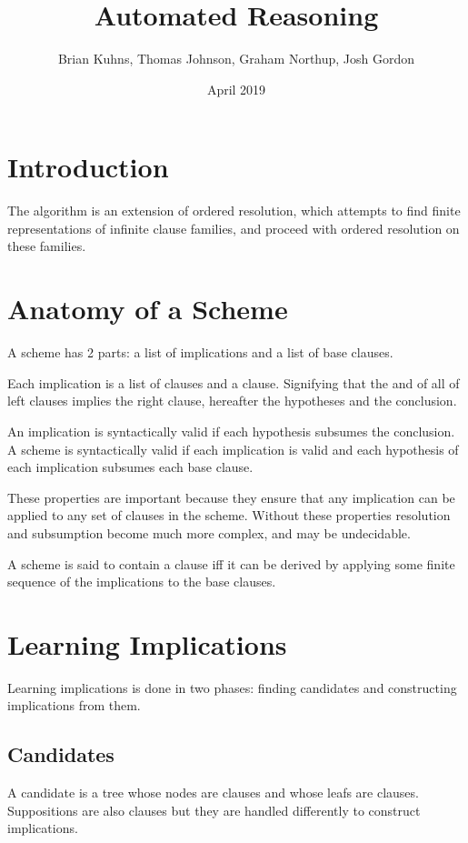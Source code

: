 \documentclass{article}
\title{Automated Reasoning}
\author{
    Brian Kuhns,
    Thomas Johnson,
    Graham Northup,
    Josh Gordon
  } %
\date{April 2019}
\begin{document}
\maketitle

\section{Introduction}

The algorithm is an extension of ordered resolution,
which attempts to find finite representations of infinite clause families,
and proceed with ordered resolution on these families.

\section{Anatomy of a Scheme}

A scheme has 2 parts:
a list of implications and a list of base clauses.

Each implication is a list of clauses and a clause.
Signifying that the and of all of left clauses implies the right clause,
hereafter the hypotheses and the conclusion.

An implication is syntactically valid if each hypothesis subsumes the conclusion.
A scheme is syntactically valid if each implication is valid and
each hypothesis of each implication subsumes each base clause.

These properties are important because they ensure that any implication can be applied to any set of clauses in the scheme.
Without these properties resolution and subsumption become much more complex, and may be undecidable.

A scheme is said to contain a clause iff it can be derived by applying some finite sequence of the 
implications to the base clauses.

\section{Learning Implications}

Learning implications is done in two phases: finding candidates and constructing implications from them.
 
\subsection{Candidates}

A candidate is a tree whose nodes are clauses and whose leafs are clauses.
Suppositions are also clauses but they are handled differently to construct implications.
  
\end{document}
